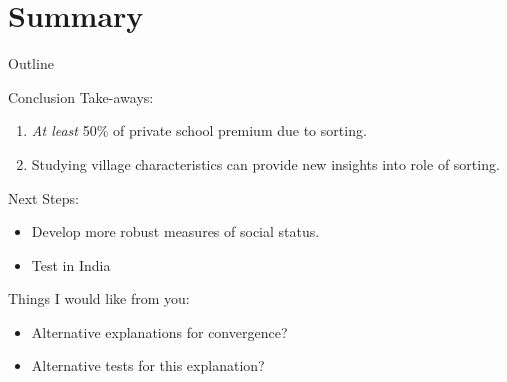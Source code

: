 \documentclass{beamer}
\begin{document}
\section{Summary}\label{}
\begin{frame}{Outline}
	\tableofcontents[current]
\end{frame}



\begin{frame}{Conclusion}
Take-aways:
	\begin{enumerate}
		\item \emph{At least} 50\% of private school premium due to sorting.
		\pause
		\item Studying village characteristics can provide new insights into role of sorting.
	\end{enumerate}
\pause
Next Steps:
\begin{itemize}
	\item Develop more robust measures of social status.
	\item Test in India
\end{itemize}

\pause
Things I would like from you:
\begin{itemize}
	\item Alternative explanations for convergence?
	\item Alternative tests for this explanation?
\end{itemize}

\end{frame}
\end{document}
